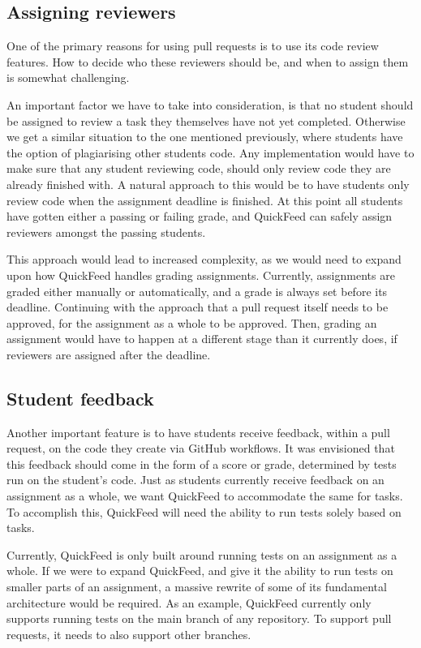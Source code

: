 \subsection{Assigning reviewers}

One of the primary reasons for using pull requests is to use its code review features.
How to decide who these reviewers should be, and when to assign them is somewhat challenging.

An important factor we have to take into consideration, is that no student should be assigned to review a task they themselves have not yet completed.
Otherwise we get a similar situation to the one mentioned previously, where students have the option of plagiarising other students code.
Any implementation would have to make sure that any student reviewing code, should only review code they are already finished with.
A natural approach to this would be to have students only review code when the assignment deadline is finished.
At this point all students have gotten either a passing or failing grade, and QuickFeed can safely assign reviewers amongst the passing students.

This approach would lead to increased complexity, as we would need to expand upon how QuickFeed handles grading assignments.
Currently, assignments are graded either manually or automatically, and a grade is always set before its deadline.
Continuing with the approach that a pull request itself needs to be approved, for the assignment as a whole to be approved.
Then, grading an assignment would have to happen at a different stage than it currently does, if reviewers are assigned after the deadline.

\subsection{Student feedback}

Another important feature is to have students receive feedback, within a pull request, on the code they create via GitHub workflows.
It was envisioned that this feedback should come in the form of a score or grade, determined by tests run on the student's code.
Just as students currently receive feedback on an assignment as a whole, we want QuickFeed to accommodate the same for tasks.
To accomplish this, QuickFeed will need the ability to run tests solely based on tasks.

Currently, QuickFeed is only built around running tests on an assignment as a whole.
If we were to expand QuickFeed, and give it the ability to run tests on smaller parts of an assignment, a massive rewrite of some of its fundamental architecture would be required.
As an example, QuickFeed currently only supports running tests on the main branch of any repository.
To support pull requests, it needs to also support other branches.

